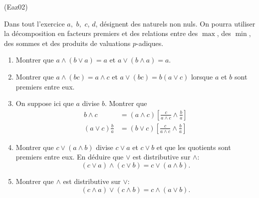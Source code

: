 \begin{tiny}(Eaz02)\end{tiny} Dans tout l'exercice $a,$ $b,$ $c$, $d$, d{\'e}signent des naturels non nuls. On pourra utiliser la décomposition en facteurs premiers et des relations entre des $\max$, des $\min$, des sommes et des produits de valuations $p$-adiques.

  \begin{enumerate}
    \item  Montrer que $a\wedge (b\vee a)=a$ et $a\vee (b\wedge a)=a.$

    \item  Montrer que $a\wedge (bc)=a\wedge c$ et $a\vee (bc)=b(a\vee c)$
lorsque $a$ et $b$ sont premiers entre eux.

    \item  On suppose ici que $a$ divise $b$. Montrer que
\begin{align*}
b\wedge c &= (a\wedge c)\left[ \frac{c}{a\wedge c}\wedge \frac{b}{a}\right]\\
(a\vee c)\frac{b}{a} &= (b\vee c)\left[ \frac{c}{a\wedge c}\wedge \frac{b}{a}\right]
\end{align*}

    \item  Montrer que $c\vee (a\wedge b)$ divise $c\vee a$ et $c\vee b$ et que les quotients sont premiers entre eux.\newline
    En déduire que $\vee $ est distributive sur $\wedge$:
\[
 (c\vee a)\wedge (c \vee b)= c\vee(a\wedge b).
\]

    \item  Montrer que $\wedge $ est distributive sur $\vee $:
\[
 (c\wedge a)\vee (c \wedge b) = c\wedge(a\vee b).
\]
  \end{enumerate}
